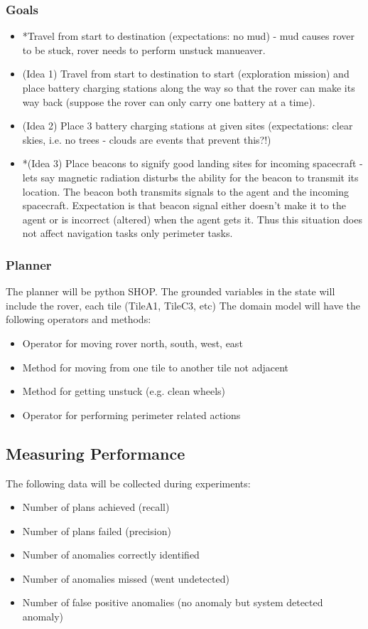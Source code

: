 \documentclass{article}
\begin{document}
\subsubsection{Goals}
\begin{itemize}
\item *Travel from start to destination (expectations: no mud) - mud causes rover to be stuck, rover needs to perform unstuck manueaver.
\item (Idea 1) Travel from start to destination to start (exploration mission) and place battery charging stations along the way so that the rover can make its way back (suppose the rover can only carry one battery at a time).
\item (Idea 2) Place 3 battery charging stations at given sites (expectations: clear skies, i.e. no trees - clouds are events that prevent this?!)
\item *(Idea 3) Place beacons to signify good landing sites for incoming spacecraft - lets say magnetic radiation disturbs the ability for the beacon to transmit its location. The beacon both transmits signals to the agent and the incoming spacecraft. Expectation is that beacon signal either doesn't make it to the agent or is incorrect (altered) when the agent gets it. Thus this situation does not affect navigation tasks only perimeter tasks.
\end{itemize}

\subsubsection{Planner}
The planner will be python SHOP. The grounded variables in the state
will include the rover, each tile (TileA1, TileC3, etc) The domain
model will have the following operators and methods:

\begin{itemize}
\item Operator for moving rover north, south, west, east
\item Method for moving from one tile to another tile not adjacent 
\item Method for getting unstuck (e.g. clean wheels)
\item Operator for performing perimeter related actions
\end{itemize} 

\subsection{Measuring Performance}
The following data will be collected during experiments:
\begin{itemize}
\item Number of plans achieved (recall)
\item Number of plans failed (precision)
\item Number of anomalies correctly identified
\item Number of anomalies missed (went undetected)
\item Number of false positive anomalies (no anomaly but system detected anomaly)
\end{itemize}
\end{document}
